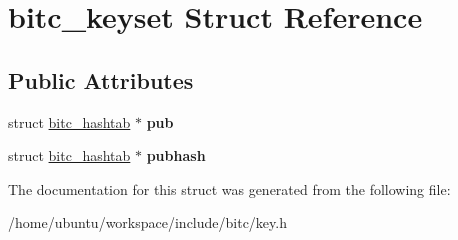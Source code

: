 \hypertarget{structbitc__keyset}{\section{bitc\-\_\-keyset Struct Reference}
\label{structbitc__keyset}
}
\subsection*{Public Attributes}
\begin{DoxyCompactItemize}
\item 
\hypertarget{structbitc__keyset_afa6abb6c58975d72d874c26d3b827dbc}{struct \hyperlink{structbitc__hashtab}{bitc\-\_\-hashtab} $\ast$ {\bfseries pub}}\label{structbitc__keyset_afa6abb6c58975d72d874c26d3b827dbc}

\item 
\hypertarget{structbitc__keyset_a3b8fc7709288e64e247396d2e77a7c2e}{struct \hyperlink{structbitc__hashtab}{bitc\-\_\-hashtab} $\ast$ {\bfseries pubhash}}\label{structbitc__keyset_a3b8fc7709288e64e247396d2e77a7c2e}

\end{DoxyCompactItemize}


The documentation for this struct was generated from the following file\-:\begin{DoxyCompactItemize}
\item 
/home/ubuntu/workspace/include/bitc/key.\-h\end{DoxyCompactItemize}
